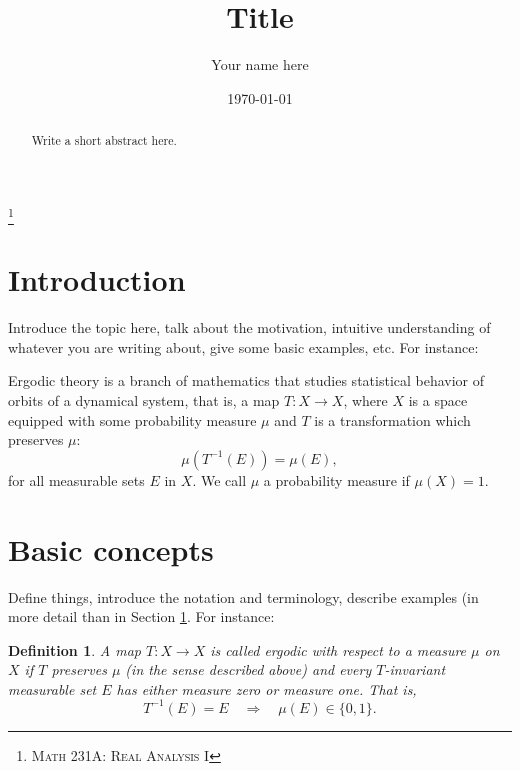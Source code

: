 \documentclass[12pt,letterpaper,reqno]{amsart}
\theoremstyle{plain}                              %
\newtheorem{defn}[thm]{Definition}
\theoremstyle{definition}                         %
\theoremstyle{remark}                             %
\numberwithin{equation}{section}
\begin{document}
\title[short title]{Title}

\author{Your name here}

\address{Department of Mathematics, San Jos\'e State University, San
  Jos\'e, CA 95192-0103}


\thanks{\textsc{Math 231A: Real Analysis I}}

\date{\today}

\begin{abstract}
  Write a short abstract here.
\end{abstract}

\maketitle


\section{Introduction}       \label{sec:intro}

Introduce the topic here, talk about the motivation, intuitive
understanding of whatever you are writing about, give some basic
examples, etc. For instance:

\textsf{Ergodic theory} is a branch of mathematics that studies
statistical behavior of orbits of a dynamical system, that is, a map
$T : X \to X$, where $X$ is a space equipped with some probability
measure $\mu$ and $T$ is a transformation which preserves $\mu$:
%
\begin{displaymath}
  \mu(T^{-1}(E)) = \mu(E),
\end{displaymath}
%
for all measurable sets $E$ in $X$. We call $\mu$ a probability
measure if $\mu(X) = 1$. 

\section{Basic concepts}

Define things, introduce the notation and terminology, describe
examples (in more detail than in Section \ref{sec:intro}. For instance:

\begin{defn}
  A map $T : X \to X$ is called \textsf{ergodic} with respect to a
  measure $\mu$ on $X$ if $T$ preserves $\mu$ (in the sense described
  above) and every $T$-invariant measurable set $E$ has either measure
  zero or measure one. That is,
%
  \begin{displaymath}
    T^{-1}(E) = E \quad \Rightarrow \quad \mu(E) \in \{ 0, 1 \}.
  \end{displaymath}

\end{defn}
\end{document}
